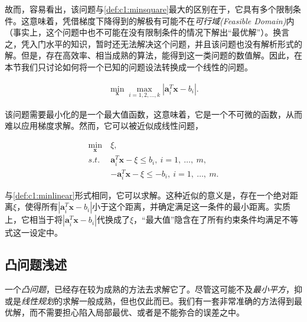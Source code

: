 故而，容易看出，该问题与\autoref{def:c1:minsquare}最大的区别在于，它具有多个限制条件。这意味着，凭借梯度下降得到的解极有可能不在\emph{可行域(Feasible Domain)}内（事实上，这个问题中也不可能在没有限制条件的情况下解出``最优解''）。换言之，凭入门水平的知识，暂时还无法解决这个问题，并且该问题也没有解析形式的解。但是，存在高效率、相当成熟的算法，能得到这一类问题的数值解。因此，在本节我们只讨论如何将一个已知的问题设法转换成一个线性的问题。

\begin{problem}[切比雪夫近似问题] \label{def:c1:chebyapp}
	\begin{align} \label{fml:c1:chebyapp}
		\min\limits_{\mathbf{x}} \max_{i=1,2,\ldots,k} |\mathbf{a}_i^T\mathbf{x}-b_i|.
	\end{align}
\end{problem}

该问题需要最小化的是一个最大值函数，这意味着，它是一个不可微的函数，从而难以应用梯度求解。然而，它可以被近似成线性问题，

\begin{problem} \label{def:c1:chebyapplin}
	\begin{subequations}
		\renewcommand{\theequation}
		{\theparentequation-\arabic{equation}}
		\begin{align}
		\min\limits_{\mathbf{x}}~&\xi,\label{fml:c1:chebyapplin}\\ 
		s.t.~&\mathbf{a}_i^T\mathbf{x}-\xi \leqslant b_i,~i=1,~\ldots,~m, \label{fml:c1:chebyapplinconst1}\\
		&-\mathbf{a}_i^T\mathbf{x}-\xi \leqslant -b_i,~i=1,~\ldots,~m. \label{fml:c1:chebyapplinconst2}
		\end{align}
	\end{subequations}
\end{problem}

与\autoref{def:c1:minlinear}形式相同，它可以求解。这种近似的意义是，存在一个绝对距离$\xi$，使得所有$|\mathbf{a}_i^T\mathbf{x}-b_i|$小于这个距离，并确定满足这一条件的最小距离。实质上，它相当于将$|\mathbf{a}_i^T\mathbf{x}-b_i|$代换成了$\xi$，``最大值''隐含在了所有约束条件均满足不等式这一设定中。

\subsection{凸问题浅述}
\label{c1:convex}
一个\emph{凸问题}，已经存在较为成熟的方法去求解它了。尽管这可能不及\emph{最小平方}，抑或是\emph{线性规划}的求解一般成熟，但也仅此而已。我们有一套非常准确的方法得到最优解，而不需要担心陷入局部最优、或者是不能弥合的误差之中。

